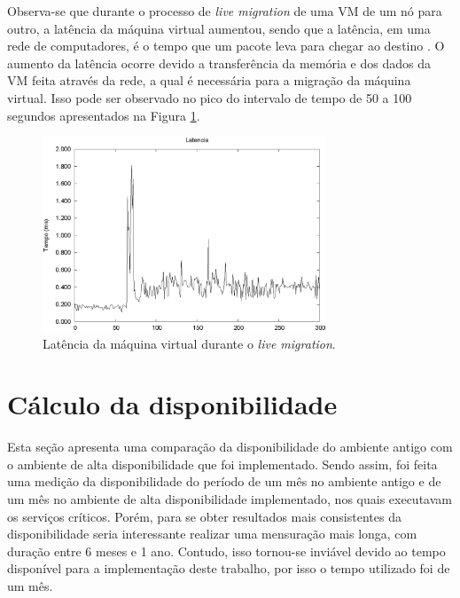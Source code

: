 Observa-se que durante o processo de \textit{live migration} de uma \ac{VM} de um nó para outro, a latência da máquina virtual aumentou, 
sendo que a latência, em uma rede de computadores, é o tempo que um pacote leva para chegar ao destino \cite{geordano2014}.
O aumento da latência ocorre devido a transferência da memória e dos dados da \ac{VM} feita através da rede, a qual é necessária para a migração 
da máquina virtual. Isso pode ser observado no pico do intervalo de tempo de 50 a 100 segundos apresentados na Figura \ref{fig:teste2_latencia}.

\begin{figure}[h!]
 \centering
 \includegraphics[width=320px]{img/teste2_latencia.eps}
 \caption{Latência da máquina virtual durante o \textit{live migration}.}
 \label{fig:teste2_latencia}
\end{figure}


\section{Cálculo da disponibilidade}
\label{section:comparacaofinal}

Esta seção apresenta uma comparação da disponibilidade do ambiente antigo com o ambiente de alta disponibilidade que foi implementado. 
Sendo assim, foi feita uma medição da disponibilidade do período de um mês no ambiente antigo e de um mês no ambiente de alta disponibilidade 
implementado, nos quais executavam os serviços críticos. Porém, para se obter resultados mais consistentes da disponibilidade seria interessante 
realizar uma mensuração mais longa, com duração entre 6 meses e 1 ano. Contudo, isso tornou-se inviável devido ao tempo disponível para a 
implementação deste trabalho, por isso o tempo utilizado foi de um mês. 

